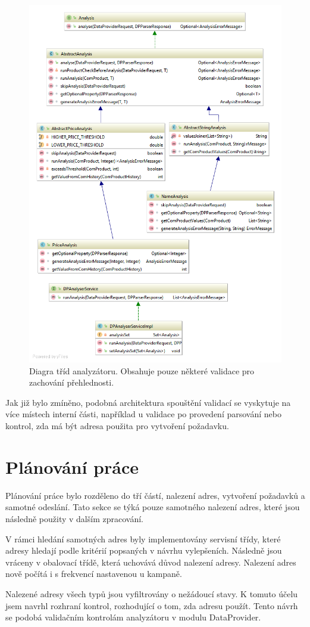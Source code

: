\documentclass[thesis=B,czech]{FITthesis}[2012/06/26]
\begin{document}
\begin{figure}\centering
 	\includegraphics[width=1.0\textwidth]{resources/analyser-classes}
	\caption[Diagram tříd analyzátoru]{Diagra tříd analyzátoru. Obsahuje pouze některé validace pro zachování přehlednosti.}\label{fig:analyser-classes}
\end{figure}


Jak již bylo zmíněno, podobná architektura spouštění validací se vyskytuje na více místech interní části, například u validace po provedení
parsování nebo kontrol, zda má být adresa použita pro vytvoření požadavku.


\section{Plánování práce}\label{ch:planning}
Plánování práce bylo rozděleno do tří částí, nalezení adres, vytvoření požadavků a samotné odeslání.
Tato sekce se týká pouze samotného nalezení adres, které jsou následně použity v dalším zpracování.
\par
V rámci hledání samotných adres byly implementovány servisní třídy, které adresy hledají podle kritérií popsaných v 
návrhu vylepšeních. Následně jsou vráceny v obalovací třídě, která uchovává důvod nalezení adresy. Nalezení adres nově počítá i s frekvencí nastavenou u kampaně.
\par
Nalezené adresy všech typů jsou vyfiltrovány o nežádoucí stavy. K tomuto účelu jsem navrhl rozhraní kontrol, rozhodující 
o tom, zda adresu použít. Tento návrh se podobá validačním kontrolám analyzátoru v modulu DataProvider.
\end{document}

